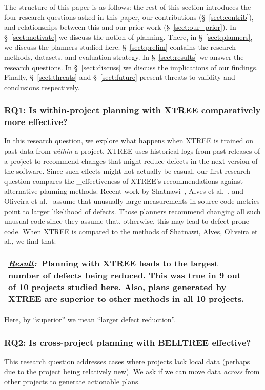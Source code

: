 \documentclass[10pt, journal, compsoc]{IEEEtran}
\newcommand{\result}[1]{
\vspace{0.2cm}
\noindent\begin{minipage}{\linewidth}
\begin{tabular}{|p{0.95\linewidth}|}
\hline\vspace{-0.2cm}
\textbf{\textit{\underline{Result}:}}~#1\\\hline
\end{tabular}
\end{minipage}\bigstrut
}
\newcommand{\tion}[1]{\S~\ref{sect:#1}}
\begin{document}
The structure of this paper is as follows: the rest of this section introduces the four research questions asked in this paper, our contributions (\tion{contrib}), and relationships between this and our prior work (\tion{our_prior}). In \tion{motivate} we discuss the notion of planning. There, in \tion{planners}, we discuss the planners studied here. \tion{prelim} contains the research methods, datasets, and evaluation strategy. In \tion{results} we answer the research questions. In \tion{discuss} we discuss the implications of our findings. Finally, \tion{threats} and \tion{future} present threats to validity and conclusions respectively.

\subsubsection*{RQ1: Is within-project planning with XTREE comparatively more effective?}

In this research question, we explore what happens when XTREE  is trained on past data from \textit{within} a project. XTREE uses
historical logs from past releases of a project to recommend changes that might reduce defects in the next version of the software. Since such effects might not actually be casual, 
our first research question compares 
the _effectiveness of XTREE's recommendations against  alternative planning methods. Recent work by Shatnawi~\cite{shatnawi}, Alves et al.~\cite{alves}, and Oliveira et al.~\cite{oliveira} assume that unusually large measurements in source code metrics point to larger likelihood of defects. Those
planners recommend changing all such unusual code since they assume that, otherwise, this may lead to defect-prone code. When XTREE is compared to the methods
of Shatnawi, Alves, Oliveira et al., we find that: 

\result{Planning with XTREE leads to the largest number of defects being reduced. This was true in 9 out of 10 projects studied here. Also, plans generated by XTREE are superior to other methods in all 10 projects.}

\vspace{2mm}
\noindent Here, by ``superior'' we mean ``larger defect reduction''.

\subsubsection*{RQ2: Is cross-project planning with BELLTREE effective?}
  
This research question addresses cases where projects lack local data (perhaps due to the project being relatively new). We ask if we can move data {\em across}
from other projects to generate actionable plans.
\end{document}
